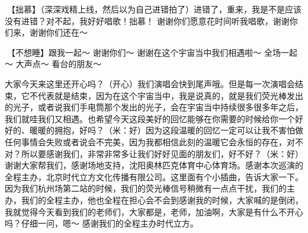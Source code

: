 \documentclass[
]{book}
\begin{document}
🎵【拙慕】（深深戏精上线，然后以为自己进错拍了）进错了，重来，我是不是应该没有进错？对不起，我好好唱歌！拙慕！
谢谢你们愿意花时间听我唱歌，谢谢你们来，谢谢你们还在～

🎵【不想睡】跟我一起～ 谢谢你们～ 谢谢在这个宇宙当中我们相遇啦～ 全场一起～ 大声点～ 看台的朋友～

大家今天来这里还开心吗？（开心）我们演唱会快到尾声哦。但是每一次演唱会结束，它不代表就是结束，因为在这个宇宙当中，我是说真的，就是我们荧光棒发出的光子，或者说我们手电筒那个发出的光子，会在宇宙当中持续很多很多年之后，我们就哇我们又相遇。也希望今天这段美好的回忆能够在你需要的时候给你一个好好的、暖暖的拥抱，好吗？（米：好）因为这段温暖的回忆一定可以让我不害怕做任何事情会失败或者说会不完美，因为我都相信此刻的温暖它会永恒的存在，对不对？所以要感谢我们，非常非常多让我们好好见面的朋友们，好不好？（米：好）谢谢大家帮我们，感谢场地支持，沈阳奥林匹克体育中心体育场。感谢本次巡演的全程主办，北京时代立方文化传播有限公司。这里面有个小插曲，告诉大家一下。因为我们杭州场第二站的时候，我们的荧光棒信号稍微有一点点干扰，我们的主办，我们的全程主办，他也全程在担心会不会到感谢我的时候，大家喊的是倒闭，我就觉得今天看到我们的老师们，大家都是，老师，加油啊，大家是有什么不开心吗？仔细一问，嗯～ 感谢我们的全程主办时代立方。
\end{document}
